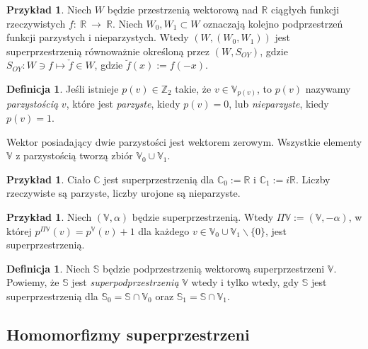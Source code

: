 \documentclass[11pt,a4paper]{report}
\theoremstyle{definition}
\newtheorem{example}[theorem]{Przykład}
\newtheorem{definition}[theorem]{Definicja}
\begin{document}
\begin{example}
	Niech $W$ będzie przestrzenią wektorową nad $\mathbb{R}$ ciągłych funkcji rzeczywistych $f:~\mathbb{R}~\rightarrow~\mathbb{R}$. Niech $W_0, W_1 \subset W$ oznaczają kolejno podprzestrzeń funkcji parzystych i nieparzystych. Wtedy $\left( W,(W_0, W_1) \right)$ jest superprzestrzenią równoważnie określoną przez $(W, S_{OY})$, gdzie $S_{OY}: W \ni f \mapsto \check{f} \in W$, gdzie $\breve{f} (x) := f(-x).$
\end{example}

\begin{definition}
	Jeśli istnieje $p(v) \in \mathbb{Z}_2$ takie, że $v \in \mathbb{V}_{p(v)}$, to $p(v)$ nazywamy \textit{parzystością} $v$, które jest \textit{parzyste}, kiedy $p(v) = 0$, lub \textit{nieparzyste}, kiedy $p(v) = 1$.
\end{definition}

Wektor posiadający dwie parzystości jest wektorem zerowym. Wszystkie elementy $\mathbb{V}$ z parzystością tworzą zbiór $\mathbb{V}_0 \cup \mathbb{V}_1$.

\begin{example}
	Ciało $\mathbb{C}$ jest superprzestrzenią dla $\mathbb{C}_0 := \mathbb{R}$ i $\mathbb{C}_1 := i\mathbb{R}$. Liczby rzeczywiste są parzyste, liczby urojone są nieparzyste.
\end{example}

\begin{example}
	\label{ex:parity_exchange}
	Niech $(\mathbb{V}, \alpha)$ będzie superprzestrzenią. Wtedy $\Pi \mathbb{V} := (\mathbb{V}, -\alpha)$, w której $p^{\Pi \mathbb{V}}(v) = p^\mathbb{V}(v) + 1$ dla każdego $v \in \mathbb{V}_0 \cup \mathbb{V}_1 \backslash \{ 0 \}$, jest superprzestrzenią.
\end{example}

\begin{definition}
	\label{def:supersubspace}
	Niech $\mathbb{S}$ będzie podprzestrzenią wektorową superprzestrzeni $\mathbb{V}$. Powiemy, że $\mathbb{S}$ jest \textit{superpodprzestrzenią} $\mathbb{V}$ wtedy i tylko wtedy, gdy $\mathbb{S}$ jest superprzestrzenią dla $\mathbb{S}_0 = \mathbb{S} \cap \mathbb{V}_0$ oraz $\mathbb{S}_1 = \mathbb{S} \cap \mathbb{V}_1$.
\end{definition}

\subsection{Homomorfizmy superprzestrzeni}
\end{document}
